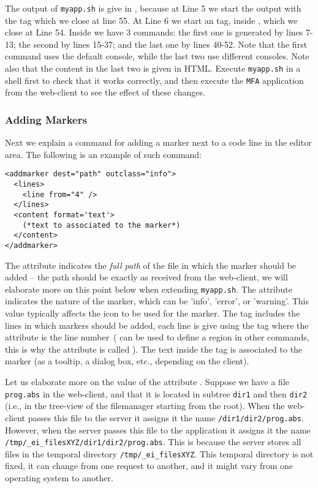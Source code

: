 \medskip
\noindent
The output of \texttt{myapp.sh} is give in \eiol, because at Line 5 we
start the output with the tag  which we close at line 55.
%
At Line 6 we start an  tag, inside , which
we close at Line 54.
%
Inside  we have 3  commands:
%
the first one is generated by lines 7-13; the second by lines 15-37;
and the last one by lines 40-52.
%
Note that the first command uses the default console, while the last
two use different consoles. Note also that the content in the last two
is given in HTML. 
%
Execute \texttt{myapp.sh} in a shell first to check that it works
correctly, and then execute the \texttt{MFA} application from the
web-client to see the effect of these changes.

\subsubsection{Adding Markers}

Next we explain a command for adding a marker next to a code line in
the editor area. The following is an example of such command:

\medskip
\begin{lstlisting}
<addmarker dest="path" outclass="info">
  <lines>
    <line from="4" />
  </lines>
  <content format='text'>
    (*text to associated to the marker*)
  </content>
</addmarker>
\end{lstlisting}

\medskip
\noindent
The attribute  indicates the \emph{full path} of the file in
which the marker should be added -- the path should be exactly as
received from the web-client, we will elaborate more on this point
below when extending \texttt{myapp.sh}.
%
The attribute  indicates the nature of the marker, which
can be 'info', 'error', or 'warning'. This value typically affects the
icon to be used for the marker.
%
The tag  includes the lines in which markers should be
added, each line is give using the tag  where the 
attribute is the line number~( can be used to define a
region in other commands, this is why the attribute is called
).
%
The text inside the  tag is associated to the marker (as
a tooltip, a dialog box, etc., depending on the client).

Let us elaborate more on the value of the attribute
. Suppose we have a file \texttt{prog.abs} in the
web-client, and that it is located in subtree \texttt{dir1} and then
\texttt{dir2} (i.e., in the tree-view of the filemanager starting from
the root).
%
When the web-client passes this file to the server it assigns it the
name \texttt{/dir1/dir2/prog.abs}. However, when the server passes
this file to the application it assigns it the name
\texttt{/tmp/\_ei\_filesXYZ/dir1/dir2/prog.abs}. 
%
This is because the server stores all files in the temporal directory
\texttt{/tmp/\_ei\_filesXYZ}. This temporal directory is not fixed, it
can change from one request to another, and it might vary from one
operating system to another.

